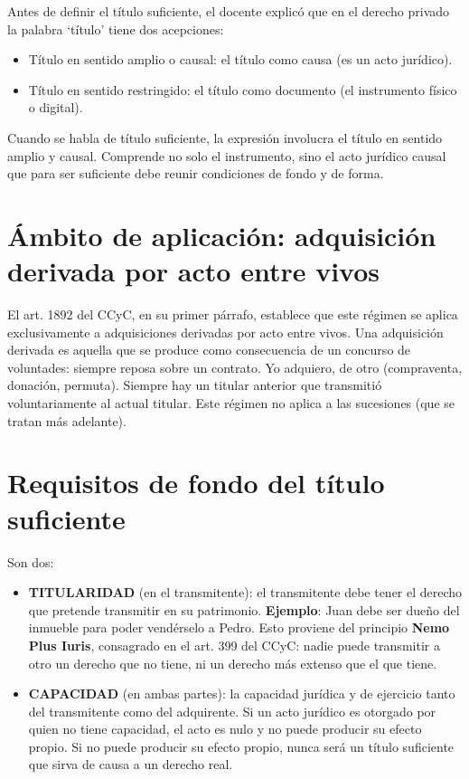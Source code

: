 \documentclass[12pt,oneside]{book}
\begin{document}
Antes de definir el título suficiente, el docente explicó que en el derecho privado la palabra `título' tiene dos acepciones:

\begin{itemize}
    \item Título en sentido amplio o causal: el título como causa (es un acto jurídico).
    \item Título en sentido restringido: el título como documento (el instrumento físico o digital).
\end{itemize}

Cuando se habla de título suficiente, la expresión involucra el título en sentido amplio y causal. Comprende no solo el instrumento, sino el acto jurídico causal que para ser suficiente debe reunir condiciones de fondo y de forma.

\section{Ámbito de aplicación: adquisición derivada por acto entre vivos}
\label{sec:ambito-aplicacion}

El art. 1892 del CCyC, en su primer párrafo, establece que este régimen se aplica exclusivamente a adquisiciones derivadas por acto entre vivos. Una adquisición derivada es aquella que se produce como consecuencia de un concurso de voluntades: siempre reposa sobre un contrato. Yo adquiero, de otro (compraventa, donación, permuta). Siempre hay un titular anterior que transmitió voluntariamente al actual titular. Este régimen no aplica a las sucesiones (que se tratan más adelante).

\section{Requisitos de fondo del título suficiente}
\label{sec:requisitos-fondo}

Son dos:

\begin{itemize}
    \item \textbf{TITULARIDAD} (en el transmitente): el transmitente debe tener el derecho que pretende transmitir en su patrimonio. \textbf{Ejemplo}: Juan debe ser dueño del inmueble para poder vendérselo a Pedro. Esto proviene del principio \textbf{Nemo Plus Iuris}, consagrado en el art. 399 del CCyC: nadie puede transmitir a otro un derecho que no tiene, ni un derecho más extenso que el que tiene.
    \item \textbf{CAPACIDAD} (en ambas partes): la capacidad jurídica y de ejercicio tanto del transmitente como del adquirente. Si un acto jurídico es otorgado por quien no tiene capacidad, el acto es nulo y no puede producir su efecto propio. Si no puede producir su efecto propio, nunca será un título suficiente que sirva de causa a un derecho real.
\end{itemize}
\end{document}
